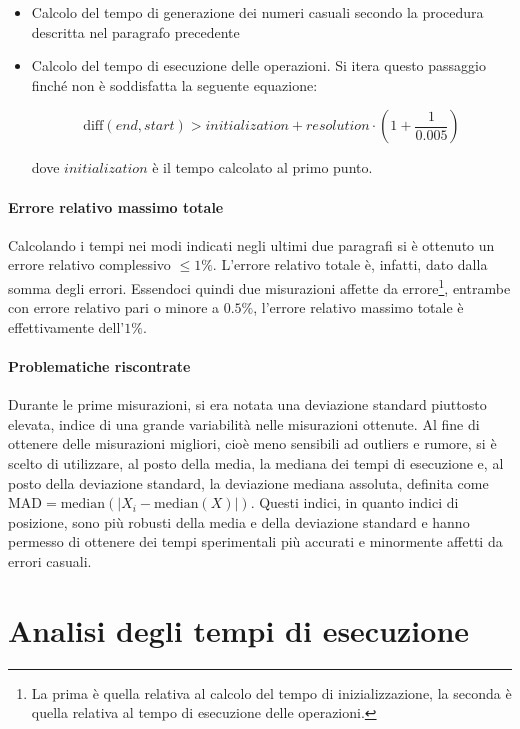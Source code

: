 \documentclass{article}
\begin{document}
	\begin{itemize}
		\item Calcolo del tempo di generazione dei numeri casuali secondo la procedura descritta nel paragrafo precedente
		\item Calcolo del tempo di esecuzione delle operazioni. Si itera questo passaggio finché non è soddisfatta la seguente equazione:
		
			\[
				\text{diff}\left(end, start\right) > initialization + resolution \cdot \left(1+\frac{1}{0.005}\right)  
			\]
			
			dove $initialization$ è il tempo calcolato al primo punto.
	\end{itemize}
	
	\newpage
	
	\paragraph{Errore relativo massimo totale}
	Calcolando i tempi nei modi indicati negli ultimi due paragrafi si è ottenuto un errore relativo complessivo $\leq1\%$. L'errore relativo totale è, infatti, dato dalla somma degli errori. Essendoci quindi due misurazioni affette da errore\footnote{La prima è quella relativa al calcolo del tempo di inizializzazione, la seconda è quella relativa al tempo di esecuzione delle operazioni.}, entrambe con errore relativo pari o minore a $0.5\%$, l'errore relativo massimo totale è effettivamente dell'$1\%$.
	
	\paragraph{Problematiche riscontrate}
	Durante le prime misurazioni, si era notata una deviazione standard piuttosto elevata, indice di una grande variabilità nelle misurazioni ottenute. Al fine di ottenere delle misurazioni migliori, cioè meno sensibili ad outliers e rumore, si è scelto di utilizzare, al posto della media, la mediana dei tempi di esecuzione e, al posto della deviazione standard, la deviazione mediana assoluta, definita come $\textrm{MAD}=\textrm{median}\left(\mathopen|X_{i}-\textrm{median}\left(X\right)\mathclose|\right)$. Questi indici, in quanto indici di posizione, sono più robusti della media e della deviazione standard e hanno permesso di ottenere dei tempi sperimentali più accurati e minormente affetti da errori casuali.
	
	\newpage
	\section{Analisi degli tempi di esecuzione}
	
\end{document}
